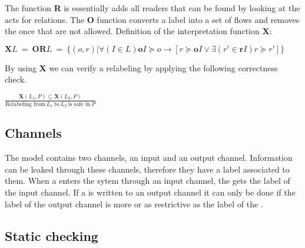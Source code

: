 The function \textbf{R} is essentially adds all readers that can be found by looking at the acts for relations.
The \textbf{O} function converts a label into a set of flows and removes the once that are not allowed.
Definition of the interpretation function $\textbf{X}$:
\begin{definition}
  $\textbf{X}L \ = \ \textbf{OR}L \ = \ \{(o,r)|\forall (I \in L) \textbf{o}I \succeq o \rightarrow [r \succeq \textbf{o}I \vee \exists (r' \in \textbf{r}I) r \succeq r'] \}$
\end{definition}

By using \textbf{X} we can verify a relabeling by applying the following correctness check.
\begin{definition}
  $\frac{\textbf{X}(L_1, P)\subseteq \textbf{X}(L_2,P)}{\mbox{Relabeling from} \ L_1 \ \mbox{to} \ L_2 \ \mbox{is safe in} \ P }$
\end{definition}

\subsection{Channels}
The model contains two channels, an input and an output channel.
Information can be leaked through these channels, therefore they have a label associated to them.
When a \xvalue{} enters the sytem through an input channel, the \xvalue{} gets the label of the input channel.
If a \xvalue{} is written to an output channel it can only be done if the label of the output channel is more or as restrictive as the label of the \xvalue{}.

\subsection{Static checking}
